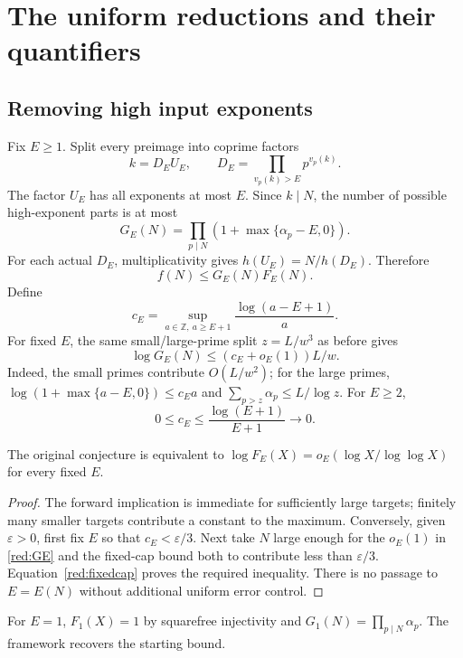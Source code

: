 \chapter{The uniform reductions and their quantifiers}\label{ch:reductions}

\section{Removing high input exponents}
Fix $E\ge1$. Split every preimage into coprime factors
\[
 k=D_EU_E,\qquad D_E=\prod_{v_p(k)>E}p^{v_p(k)}.
\]
The factor $U_E$ has all exponents at most $E$. Since $k\mid N$, the number
of possible high-exponent parts is at most
\[
 G_E(N)=\prod_{p\mid N}\left(1+\max\{\alpha_p-E,0\}\right).
\]
For each actual $D_E$, multiplicativity gives $h(U_E)=N/h(D_E)$. Therefore
\begin{equation}\label{red:fixedcap}
 \boxed{f(N)\le G_E(N)F_E(N).}
\end{equation}
Define
\[
 c_E=\sup_{a\in\mathbb Z,\ a\ge E+1}\frac{\log(a-E+1)}a.
\]
For fixed $E$, the same small/large-prime split $z=L/w^3$ as before gives
\begin{equation}\label{red:GE}
 \log G_E(N)\le(c_E+o_E(1))L/w.
\end{equation}
Indeed, the small primes contribute $O(L/w^2)$; for the large primes,
$\log(1+\max\{a-E,0\})\le c_Ea$ and $\sum_{p>z}\alpha_p\le L/\log z$.
For $E\ge2$,
\[
 0\le c_E\le\frac{\log(E+1)}{E+1}\longrightarrow0.
\]

\begin{theorem}\label{red:equivalence}
The original conjecture is equivalent to
$\log F_E(X)=o_E(\log X/\log\log X)$ for every fixed $E$.
\end{theorem}
\begin{proof}
The forward implication is immediate for sufficiently large targets; finitely
many smaller targets contribute a constant to the maximum. Conversely, given
$\varepsilon>0$, first fix $E$ so that $c_E<\varepsilon/3$. Next take $N$
large enough for the $o_E(1)$ in \eqref{red:GE} and the fixed-cap bound both
to contribute less than $\varepsilon/3$. Equation~\eqref{red:fixedcap} proves
the required inequality. There is no passage to $E=E(N)$ without additional
uniform error control.
\end{proof}
For $E=1$, $F_1(X)=1$ by squarefree injectivity and
$G_1(N)=\prod_{p\mid N}\alpha_p$. The framework recovers the starting bound.

